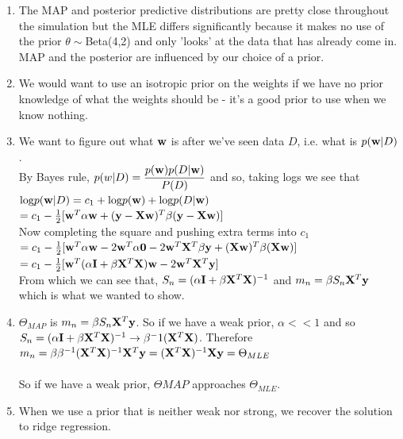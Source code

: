 \documentclass[submit]{harvardml}
\begin{document}
\begin{enumerate}
\item The MAP and posterior predictive distributions are pretty close throughout the simulation but the MLE differs significantly because it makes no use of the prior $\theta\sim$Beta(4,2) and only 'looks' at the data that has already come in.  MAP and the posterior are influenced by our choice of a prior. 

\item We would want to use an isotropic prior on the weights if we have no prior knowledge of what the weights should be - it's a good prior to use when we know nothing.  

\item We want to figure out what $\mathbf{w}$ is after we've seen data $D$, i.e. what is $p(\mathbf{w} | D)$.  \\
By Bayes rule, $p(w|D) = \dfrac{p(\mathbf{w})p(D|\mathbf{w})}{P(D)}$ and so, taking logs we see that \\
$\textup{log}p(\mathbf{w}|D) = c_1 + \textup{log}p(\mathbf{w}) + \textup{log}p(D|\mathbf{w})$ \\
$= c_1 - \frac{1}{2}[\mathbf{w}^T\alpha\mathbf{w} + (\mathbf{y} - \mathbf{X}\mathbf{w})^T\beta(\mathbf{y} - \mathbf{X}\mathbf{w})]$ \\
Now completing the square and pushing extra terms into $c_1$ \\
$= c_1 - \frac{1}{2}[\mathbf{w}^T\alpha\mathbf{w} - 2\mathbf{w}^T\alpha\mathbf{0} - 2\mathbf{w}^T\mathbf{X}^T\beta\mathbf{y} + (\mathbf{X}\mathbf{w})^T\beta(\mathbf{X}\mathbf{w})]$ \\
$= c_1 - \frac{1}{2}[\mathbf{w}^T(\alpha\mathbf{I}+\beta\mathbf{X}^T\mathbf{X})\mathbf{w} - 2\mathbf{w}^T\mathbf{X}^T\mathbf{y}]$ \\
From which we can see that, $S_n = (\alpha\mathbf{I}+\beta\mathbf{X}^T\mathbf{X})^{-1}$ and $m_n = \beta S_n \mathbf{X}^T\mathbf{y}$ which is what we wanted to show.  

\item $\Theta_{MAP}$ is $m_n = \beta S_n\mathbf{X}^T\mathbf{y}$.  So if we have a weak prior, $\alpha << 1$ and so $S_n = (\alpha\mathbf{I} + \beta\mathbf{X}^T\mathbf{X})^{-1} \to \beta^-1(\mathbf{X}^T\mathbf{X})$.  Therefore $m_n = \beta\beta^{-1}(\mathbf{X}^T\mathbf{X})^{-1}\mathbf{X}^T\mathbf{y} = (\mathbf{X}^T\mathbf{X})^{-1}\mathbf{X}\mathbf{y} = \Theta_{MLE}$ \\
\\
So if we have a weak prior, $\Theta{MAP}$ approaches $\Theta_{MLE}$.  

\item When we use a prior that is neither weak nor strong, we recover the solution to ridge regression.  
\end{enumerate}
\end{document}
